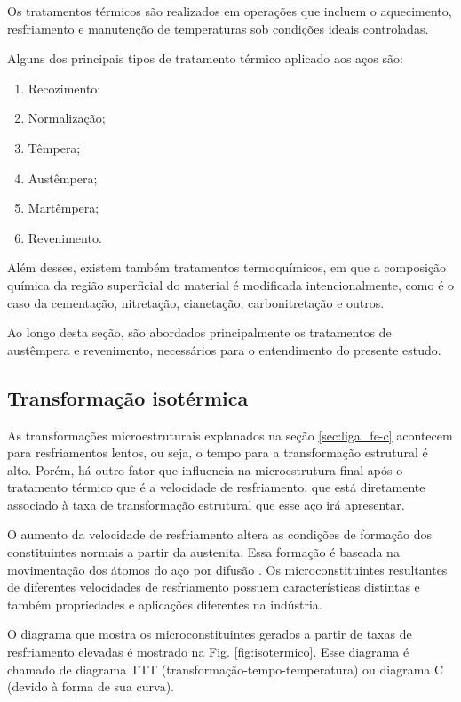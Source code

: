 \documentclass[
12pt,
openany, %
oneside, %
a4paper,			
english,			
brazil			        %
]{abntbibufjf}
\begin{document}
	Os tratamentos térmicos são realizados em operações que incluem o aquecimento, resfriamento e manutenção de temperaturas sob condições ideais controladas.

	Alguns dos principais tipos de tratamento térmico aplicado aos aços são:
\begin{enumerate}[label=(\alph*)]
	\item Recozimento;
	\item Normalização;
	\item Têmpera;
	\item Austêmpera;
	\item Martêmpera;
	\item Revenimento.
\end{enumerate}

	Além desses, existem também tratamentos termoquímicos, em que a composição química da região superficial do material é modificada intencionalmente, como é o caso da cementação, nitretação, cianetação, carbonitretação e outros.
	
	Ao longo desta seção, são abordados principalmente os tratamentos de austêmpera e revenimento, necessários para o entendimento do presente estudo.

	
\subsection{Transformação isotérmica}

	As transformações microestruturais explanados na seção \ref{sec:liga_fe-c} acontecem para resfriamentos lentos, ou seja, o tempo para a transformação estrutural é alto. Porém, há outro fator que influencia na microestrutura final após o tratamento térmico que é a velocidade de resfriamento, que está diretamente associado à taxa de transformação estrutural que esse aço irá apresentar.
	
	O aumento da velocidade de resfriamento altera as condições de formação dos constituintes normais a partir da austenita. Essa formação é baseada na movimentação dos átomos do aço por difusão \cite{chiaverini2003tratamentos}. Os microconstituintes resultantes de diferentes velocidades de resfriamento possuem características distintas e também propriedades e aplicações diferentes na indústria.
	
	O diagrama que mostra os microconstituintes gerados a partir de taxas de resfriamento elevadas é mostrado na Fig. \ref{fig:isotermico}. Esse diagrama é chamado de diagrama TTT (transformação-tempo-temperatura) ou diagrama C (devido à forma de sua curva).
	
\end{document}
